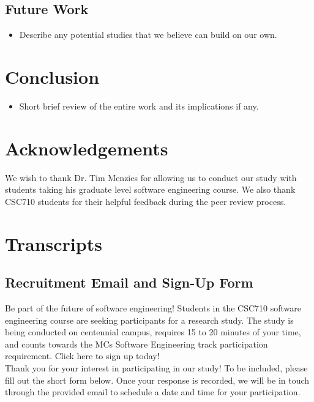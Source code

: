\documentclass{sig-alternate-05-2015}
\begin{document}
\subsection{Future Work}

\begin{itemize}
    \item Describe any potential studies that we believe can build on our own.
\end{itemize}

\section{Conclusion}
\begin{itemize}
    \item Short brief review of the entire work and its implications if any.
\end{itemize}

\section*{Acknowledgements}
We wish to thank Dr. Tim Menzies for allowing us to conduct our study with students taking his graduate level software engineering course. We also thank CSC710 students for their helpful feedback during the peer review process. 




\appendix

\section{Transcripts}

\subsection{Recruitment Email and Sign-Up Form}

\noindent Be part of the future of software engineering! Students in the CSC710 software engineering course are seeking participants for a research study. The study is being conducted on centennial campus, requires 15 to 20 minutes of your time, and counts towards the MCs Software Engineering track participation requirement. Click here to sign up today!\\

\noindent Thank you for your interest in participating in our study! To be included, please fill out the short form below. Once your response is recorded, we will be in touch through the provided email to schedule a date and time for your participation.
\end{document}
